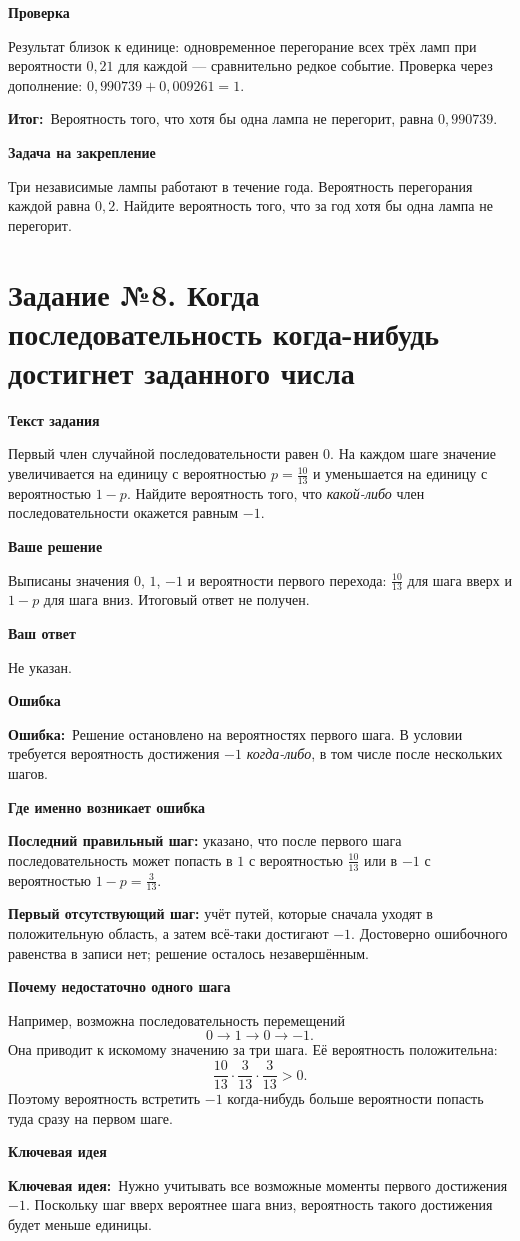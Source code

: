 \documentclass[a4paper,12pt]{article}
\newcommand{\tasktitle}[2]{\phantomsection\label{task:#1}\section*{Задание №#1. #2}}
\newcommand{\err}{\textcolor{errorred}{\textbf{Ошибка:}}\ }
\newcommand{\idea}{\textcolor{deepaccent}{\textbf{Ключевая идея:}}\ }
\newcommand{\outcome}{\textcolor{deepaccent}{\textbf{Итог:}}\ }
\newcommand{\lab}[1]{\par\noindent\textbf{#1}\par\vspace{-4pt}}
\begin{document}
\lab{Проверка}
Результат близок к единице: одновременное перегорание всех трёх ламп при вероятности $0{,}21$ для каждой --- сравнительно редкое событие. Проверка через дополнение: $0{,}990739+0{,}009261=1$.

\outcome Вероятность того, что хотя бы одна лампа не перегорит, равна $0{,}990739$.

\lab{Задача на закрепление}
Три независимые лампы работают в течение года. Вероятность перегорания каждой равна $0{,}2$. Найдите вероятность того, что за год хотя бы одна лампа не перегорит.
\newpage

\tasktitle{8}{Когда последовательность когда-нибудь достигнет заданного числа}
\lab{Текст задания}
Первый член случайной последовательности равен $0$. На каждом шаге значение увеличивается на единицу с вероятностью $p=\frac{10}{13}$ и уменьшается на единицу с вероятностью $1-p$. Найдите вероятность того, что \emph{какой-либо} член последовательности окажется равным $-1$.

\lab{Ваше решение}
Выписаны значения $0$, $1$, $-1$ и вероятности первого перехода: $\frac{10}{13}$ для шага вверх и $1-p$ для шага вниз. Итоговый ответ не получен.

\lab{Ваш ответ}
Не указан.

\lab{Ошибка}
\err Решение остановлено на вероятностях первого шага. В условии требуется вероятность достижения $-1$ \emph{когда-либо}, в том числе после нескольких шагов.

\lab{Где именно возникает ошибка}
\textbf{Последний правильный шаг:} указано, что после первого шага последовательность может попасть в $1$ с вероятностью $\frac{10}{13}$ или в $-1$ с вероятностью $1-p=\frac{3}{13}$.

\textbf{Первый отсутствующий шаг:} учёт путей, которые сначала уходят в положительную область, а затем всё-таки достигают $-1$. Достоверно ошибочного равенства в записи нет; решение осталось незавершённым.

\lab{Почему недостаточно одного шага}
Например, возможна последовательность перемещений
\[
0\longrightarrow1\longrightarrow0\longrightarrow-1.
\]
Она приводит к искомому значению за три шага. Её вероятность положительна:
\[
\frac{10}{13}\cdot\frac{3}{13}\cdot\frac{3}{13}>0.
\]
Поэтому вероятность встретить $-1$ когда-нибудь больше вероятности попасть туда сразу на первом шаге.

\lab{Ключевая идея}
\idea Нужно учитывать все возможные моменты первого достижения $-1$. Поскольку шаг вверх вероятнее шага вниз, вероятность такого достижения будет меньше единицы.
\end{document}
